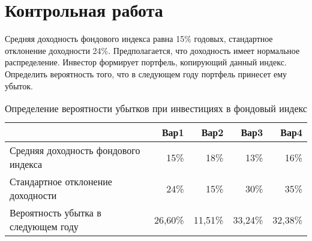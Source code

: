 \documentclass[12pt,a4paper]{article}
\begin{document}
\section{Контрольная работа}
\normalsize
\begin{taskrus}
Средняя доходность фондового индекса равна 15\% годовых, стандартное отклонение доходности 24\%. Предполагается, что доходность имеет нормальное распределение. Инвестор формирует портфель, копирующий данный индекс. Определить вероятность того, что в следующем году портфель принесет ему убыток.
\begin{table}[H]
  \centering
  \caption{Определение вероятности убытков при инвестициях в фондовый индекс}
    \begin{tabular}{lrrrr}
    \toprule
          & Вар1  & Вар2  & Вар3  & Вар4 \\
    \midrule
    Средняя доходность фондового индекса & 15\%  & 18\%  & 13\%  & 16\% \\
    Стандартное отклонение доходности & 24\%  & 15\%  & 30\%  & 35\% \\
    \midrule
    Вероятность убытка в следующем году & 26,60\% & 11,51\% & 33,24\% & 32,38\% \\
    \bottomrule
    \end{tabular}%
  \label{tab:addlabel}%
\end{table}%
\end{taskrus}
\end{document}
